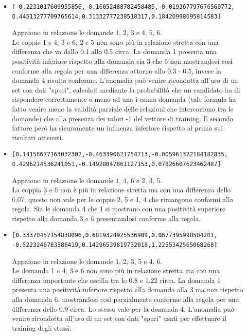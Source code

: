 \begin{itemize}
\item  \begin{verbatim}[-0.2231017609955856,-0.16052488782458485,-0.019367797676560772,
0.44513277709765614,0.31332777238518317,0.18420998695814583]
\end{verbatim}
Appaiono in relazione le domande 1, 2, 3 e 4, 5, 6.\\
Le coppie 1 e 4, 3 e 6, 2 e 5 non sono pi\`u in relazione stretta con una differenza che va dallo 0.1 allo 0.5 circa. La domanda 1 presenta una positivit\`a inferiore rispetto alla domanda sia 3 che 6 non mostrandosi cos\`i conforme alla regola per una differenza attorno allo 0.3 - 0.5, invece la domanda 4 risulta conforme. L'anomalia pu\`o venire ricondotta all'uso di un set con dati "spuri", calcolati mediante la probabilit\`a che un candidato ha di rispondere correttamente o meno ad una i-esima domanda (tale formula ha fatto venire meno la validit\`a parziale delle relazioni che intercorrono tra le domande) che alla presenza dei valori -1 del vettore di training. Il secondo fattore per\`o ha sicuramente un influenza inferiore rispetto al primo sui risultati ottenuti.

\item \begin{verbatim}[0.14156677163032302,-0.463390621754713,-0.005961372184182835,
0.4296214536241051,-0.14928047861127153,0.07826607623462487]
\end{verbatim}
Appaiono in relazione le domande 1, 4, 6 e 2, 3, 5.\\
La coppia 3 e 6 non \`e pi\`u in relazione stretta ma con una differenza dello 0.07; questo non vale per le coppie 2, 5 e 1, 4 che rimangono conformi alla regola. Sia le domanda 4 che 1 si mostrano con una positivit\`a superiore rispetto alla domanda 3 e 6 presentandosi conforme alla regola.

\item  \begin{verbatim}[0.33370457154838096,0.6819324925536909,0.0677395998504201,
-0.5223246783586419,0.14296539819732018,1.2255342565068268]
\end{verbatim}
Appaiono in relazione le domande 1, 2, 3, 5 e  4, 6.\\
Le domanda 1 e 4, 3 e 6 non sono pi\`u in relazione stretta ma con una differenza importante che oscilla tra lo 0.8 e 1.22 circa. La domanda 1 presenta una positivit\`a inferiore rispetto alla domanda alla 3 ma non rispetto alla domanda 6, mostrandosi cos\`i parzialmente conforme alla regola per una differenza dello 0.9 circa. Lo stesso vale per la domanda 4. L'anomalia pu\`o venire ricondotta all'uso di un set con dati "spuri"  usati per effettuare il training degli stessi.


\end{itemize}

